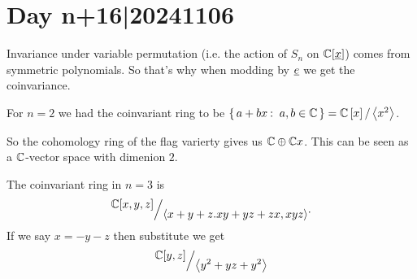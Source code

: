 \documentclass[12pt]{memoir}
\begin{document}
\section{Day n+16|20241106}

Invariance under variable permutation (i.e. the action of $S_n$ on $\mathbb{C}[\underline x]$) comes from symmetric polynomials. So that's why when modding by $\underline e$ we get the coinvariance.

\begin{Ex}
    For $n=2$ we had the coinvariant ring to be $\set{a+bx\:\ a,b\in\bC}=\bC\bonj{x}/\genr{x^2}$.\par
    So the cohomology ring of the flag varierty gives us $\mathbb{C}\oplus\mathbb{C} x$. This can be seen as a $\mathbb{C}$-vector space with dimenion $2$.
\end{Ex}

\begin{Ex}
    The coinvariant ring in $n=3$ is 
    $$\quot{\bC[x,y,z]}{\genr{x+y+z.xy+yz+zx,xyz}}.$$
    If we say $x=-y-z$ then substitute we get
    $$\quot{\bC[y,z]}{\genr{y^2+yz+y^2}}$$
\end{Ex}
\ifx\nextra\undefined
\printindex
\else\fi
\nocite{*}


\end{document}
